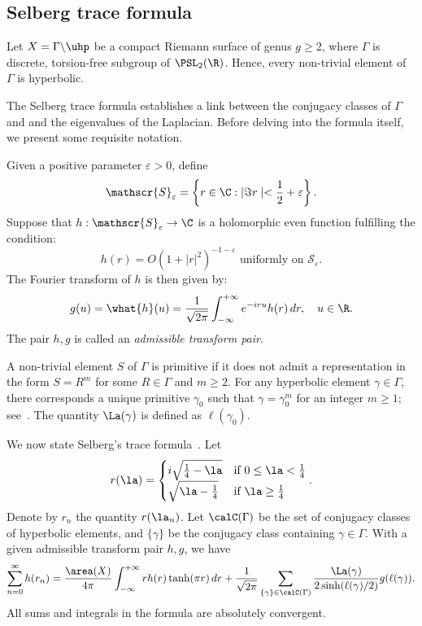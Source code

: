 \subsection{Selberg trace formula}
Let $X=\Gamma\backslash \uhp$ be a compact Riemann surface of genus $g\geq 2$, where $\Gamma$ is discrete, torsion-free subgroup of $\PSL_2(\R)$.
Hence, every non-trivial element of $\Gamma$ is hyperbolic.

The Selberg trace formula establishes a link between the conjugacy classes of $\Gamma$ and and the eigenvalues of the Laplacian.
Before delving into the formula itself, we present some requisite notation.

Given a positive parameter $\varepsilon>0$, define
\[
\mathscr{S}_{\varepsilon}=\left\{r \in \C : | \Im r \mid<\frac{1}{2}+\varepsilon\right\}.
\]
Suppose that $h: \mathscr{S}_{\varepsilon} \rightarrow \C$ is a holomorphic even function fulfilling the condition:
\begin{equation}
h(r)=O\left(1+|r|^{2}\right)^{-1-\varepsilon} \text { uniformly on } \mathscr{S}_{\varepsilon}.
\label{eq:hdecay}
\end{equation}
The Fourier transform of $h$ is then given by:
\[
g(u)=\what{h}(u)=\frac{1}{\sqrt{2 \pi}} \int_{-\infty}^{+\infty} e^{-i r u} h(r)\, d r
, \quad u \in \R.
\]
The pair $h, g$ is called an \textit{admissible transform pair}.

A non-trivial element $S$ of $\Gamma$ is primitive if it does not admit a representation in the form $S = R^m$ for some $R\in \Gamma$ and $m\geq 2$.
For any hyperbolic element $\gamma\in \Gamma$, there corresponds a unique primitive $\gamma_0$ such that $\gamma=\gamma_0^{m}$ for an integer $m \geq 1$; see~\cite[Lemma 9.2.6]{MR2742784}.
The quantity $\La(\gamma)$ is defined as $\ell\left(\gamma_{0}\right)$.

We now state Selberg's trace formula~\cite[Theorem 9.5.3]{MR2742784}.
Let
\[
r(\la) = \begin{cases}
i \sqrt{\frac{1}{4}-\la} & \text{if } 0 \leq \la < \frac{1}{4} \\
\sqrt{\la - \frac{1}{4}} & \text{if } \la \geq \frac{1}{4}
\end{cases}.
\]
Denote by $r_n$ the quantity $r(\la_n)$.
Let \(\calC(\Gamma)\) be the set of conjugacy classes of hyperbolic elements, and $\{\gamma\}$ be the conjugacy class containing $\gamma \in \Gamma$.
With a given admissible transform pair $h,g$, we have
\begin{equation}
\label{eq:STF1}
\sum_{n=0}^{\infty} h(r_{n})
=
\frac{\area(X)}{4 \pi} \int_{-\infty}^{+\infty} r h(r) \tanh (\pi r)\, dr+
\frac{1}{\sqrt{2\pi}}\sum_{\{\gamma\} \in \calC(\Gamma)} \frac{\La(\gamma)}{2 \sinh(\ell(\gamma)/2)} g(\ell(\gamma)).
\end{equation}
All sums and integrals in the formula are absolutely convergent.

